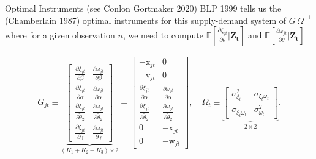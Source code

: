 \documentclass[aspectratio=169,10pt]{beamer}
\begin{document}
\begin{frame}{Optimal Instruments (see Conlon Gortmaker 2020)}
\noindent BLP 1999 tells us the (Chamberlain 1987) optimal instruments for this supply-demand system of $G\, \Omega^{-1}$ where for a given observation $n$, we need to compute $\mathbb{E}[\frac{\partial \xi_{jt}}{\partial \theta} | \symbf{Z_t}]$ and $\mathbb{E}[\frac{\partial \omega_{jt}}{\partial \theta} | \symbf{Z_t}]$

\begin{align*}
    G_{jt} \equiv \underbrace{
        \begin{bmatrix}
            \frac{\partial \xi_{jt}}{\partial \beta}
            & \frac{\partial \omega_{jt}}{\partial \beta} \\
            \frac{\partial \xi_{jt}}{\partial \alpha}
            & \frac{\partial \omega_{jt}}{\partial \alpha} \\
            \frac{\partial \xi_{jt}}{\partial \widetilde{\theta}_2}
            & \frac{\partial \omega_{jt}}{\partial \widetilde{\theta}_2} \\
            \frac{\partial \xi_{jt}}{\partial \gamma} 
            & \frac{\partial \omega_{jt}}{\partial \gamma} 
        \end{bmatrix}
    }_{(K_1 + K_2 + K_3)\times 2}
    = 
    \begin{bmatrix}
        -\mathrm{x}_{jt} & 0 \\
        -\mathrm{v}_{jt} & 0 \\
        \frac{\partial \xi_{jt}}{\partial \alpha}  
        &  \frac{\partial \omega_{jt}}{\partial \alpha}\\
        \frac{\partial \xi_{jt}}{\partial \widetilde{\theta}_2} 
        & \frac{\partial \omega_{jt}}{\partial \widetilde{\theta}_2} \\
        0 & -\mathrm{x}_{jt} \\
        0 & -\mathrm{w}_{jt}
    \end{bmatrix}
    , \quad \Omega_t \equiv 
    \underbrace{
        \begin{bmatrix}
        \sigma^2_{\xi_t} & \sigma_{\xi_t \omega_t}\\
        \sigma_{\xi_t \omega_t} & \sigma^2_{\omega_t}
    \end{bmatrix}
    }_{2 \times 2}.
\end{align*}
\end{frame}
\end{document}
